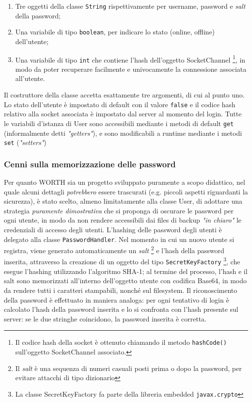 \documentclass{article}
\begin{document}
\begin{enumerate}
    \item Tre oggetti della classe \texttt{String} rispettivamente per username, password e \emph{salt} della password;
    \item Una variabile di tipo \texttt{boolean}, per indicare lo stato (online, offline) dell'utente;
    \item Una variabile di tipo \texttt{int} che contiene l'hash
          dell'oggetto SocketChannel
          \footnote{Il codice hash della socket è ottenuto chiamando il metodo \texttt{hashCode()} sull'oggetto SocketChannel associato.},
          in modo da poter recuperare facilmente e univocamente la connessione associata all'utente.
\end{enumerate}
Il costruttore della classe accetta esattamente tre argomenti, di cui al punto uno. Lo stato dell'utente è impostato di default con il valore \texttt{false} e il codice hash relativo alla socket associata è impostato dal server al momento del login. Tutte le variabili d'istanza di User sono accessibili mediante i metodi di default \texttt{get} (informalmente detti \emph{"getters"}), e sono modificabili a runtime mediante i metodi \texttt{set} (\emph{"setters"})

\subsubsection{Cenni sulla memorizzazione delle password}
Per quanto WORTH sia un progetto sviluppato puramente a scopo didattico, nel quale alcuni dettagli \emph{potrebbero} essere trascurati (e.g. piccoli aspetti riguardanti la sicurezza), è stato scelto, almeno limitatamente alla classe User, di adottare una strategia \emph{puramente dimostrativa} che si proponga di oscurare le password per ogni utente, in modo da non rendere accessibili dai files di backup \emph{"in chiaro"} le credenziali di accesso degli utenti.
L'hashing delle password degli utenti è delegato alla classe \texttt{PasswordHandler}. Nel momento in cui un nuovo utente si registra, viene generato automaticamente un \emph{salt}
\footnote{Il \emph{salt} è una sequenza di numeri casuali posti prima o dopo la password, per evitare attacchi di tipo dizionario} 
e l'hash della password inserita, attraverso la creazione di un oggetto del tipo \texttt{SecretKeyFactory}
\footnote{La classe SecretKeyFactory fa parte della libreria embedded \texttt{javax.crypto}}, 
che esegue l'hashing utilizzando l'algoritmo SHA-1; al termine del processo, l'hash e il salt sono memorizzati all'interno dell'oggetto utente con codifica Base64, in modo da rendere tutti i caratteri stampabili, nonché sul filesystem.
Il riconoscimento della password è effettuato in maniera analoga: per ogni tentativo di login è calcolato l'hash della password inserita e lo si confronta con l'hash presente sul server: se le due stringhe coincidono, la password inserita è corretta.
\end{document}
